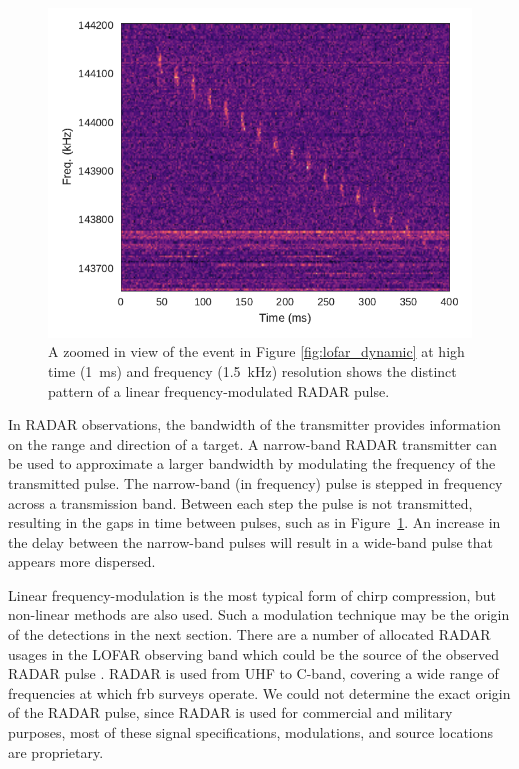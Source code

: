 \documentclass[a4paper,fleqn,usenatbib]{mnras}
\begin{document}
\begin{figure}
    \includegraphics[width=1.0\linewidth]{figures/LOFAR_dynamic_high_res.pdf}
    \caption{A zoomed in view of the event in Figure \ref{fig:lofar_dynamic} at
    high time (1~ms) and frequency (1.5~kHz) resolution shows the distinct
    pattern of a linear frequency-modulated RADAR pulse.
    }
    \label{fig:lofar_dynamic_high}
\end{figure}

In RADAR observations, the bandwidth of the transmitter provides information on
the range and direction of a target. A narrow-band RADAR transmitter can be used
to approximate a larger bandwidth by modulating the frequency of the transmitted
pulse. The narrow-band (in frequency) pulse is stepped in frequency across a
transmission band. Between each step the pulse is not transmitted, resulting in
the gaps in time between pulses, such as in Figure~\ref{fig:lofar_dynamic_high}.
An increase in the delay between the narrow-band pulses will result in a
wide-band pulse that appears more dispersed.

Linear frequency-modulation is the most typical form of chirp compression, but
non-linear methods are also used. Such a modulation technique may be the origin
of the detections in the next section.  There are a number of allocated RADAR
usages in the LOFAR observing band which could be the source of the observed
RADAR pulse \citep{ofcom2017}.  RADAR is used from UHF to C-band, covering a
wide range of frequencies at which \gls{frb} surveys operate. We could not
determine the exact origin of the RADAR pulse, since RADAR is used for
commercial and military purposes, most of these signal specifications,
modulations, and source locations are proprietary.
\end{document}

